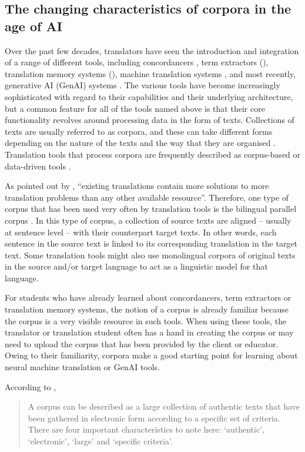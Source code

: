 \documentclass[output=paper]{langscibook}
\begin{document}
\subsection{The changing characteristics of corpora in the age of AI}\label{sec:4:2.1}
Over the past few decades, translators have seen the introduction and integration of a range of different tools, including concordancers \citep{zanettin23}, term extractors (\citealt{korkontzelosananiadou22}), translation memory systems (\citealt{melbywright23}), machine translation systems \citep{way2020}, and most recently, generative AI (GenAI) systems \citep{siu24}. The various tools have become increasingly sophisticated with regard to their capabilities and their underlying architecture, but a common feature for all of the tools named above is that their core functionality revolves around processing data in the form of texts. Collections of texts are usually referred to as corpora, and these can take different forms depending on the nature of the texts and the way that they are organised \citep{mcenery22}. Translation tools that process corpora are frequently described as corpus-based or data-driven tools \citep{wangetal22}.

As pointed out by \citet[205]{isabelleetal93}, “existing translations contain more solutions to more translation problems than any other available resource”. Therefore, one type of corpus that has been used very often by translation tools is the bilingual parallel corpus \citep{simard2020}. In this type of corpus, a collection of source texts are aligned – usually at sentence level – with their counterpart target texts. In other words, each sentence in the source text is linked to its corresponding translation in the target text. Some translation tools might also use monolingual corpora of original texts in the source and/or target language to act as a linguistic model for that language.

For students who have already learned about concordancers, term extractors or translation memory systems, the notion of a corpus is already familiar because the corpus is a very visible resource in such tools. When using these tools, the translator or translation student often has a hand in creating the corpus or may need to upload the corpus that has been provided by the client or educator. Owing to their familiarity, corpora make a good starting point for learning about neural machine translation or GenAI tools. 

According to \citet[9]{bowkerpearson2002},
\begin{quote}
  A corpus can be described as a large collection of authentic texts that have been gathered in electronic form according to a specific set of criteria. There are four important characteristics to note here: ‘authentic’, ‘electronic’, ‘large’ and ‘specific criteria’.  
\end{quote}
\end{document}
